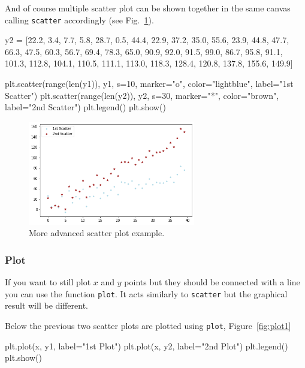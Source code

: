 And of course multiple scatter plot can be shown together in the same canvas calling \texttt{scatter} accordingly (see Fig.~\ref{fig:scatter2}).

\begin{ipythonnon}
y2 = [22.2, 3.4, 7.7, 5.8, 28.7, 0.5, 44.4, 22.9, 37.2, 35.0, 55.6,
      23.9, 44.8, 47.7, 66.3, 47.5, 60.3, 56.7, 69.4, 78.3, 65.0,
      90.9, 92.0, 91.5, 99.0, 86.7, 95.8, 91.1, 101.3, 112.8,
      104.1, 110.5, 111.1, 113.0, 118.3, 128.4, 120.8, 137.8, 155.6, 149.9]

plt.scatter(range(len(y1)), y1, s=10, marker="o",
color="lightblue", label="1st Scatter")
plt.scatter(range(len(y2)), y2, s=30, marker="*",
color="brown", label="2nd Scatter")
plt.legend()
plt.show()
\end{ipythonnon}

\begin{figure}[htb]
	\centering
	\includegraphics[width=0.65\textwidth]{figures/scatter2}
	\caption{More advanced scatter plot example.}
	\label{fig:scatter2}
\end{figure}

\subsubsection{Plot}\label{plot}

If you want to still plot $x$ and $y$ points but they should be connected with a line you can use the function \texttt{plot}. It acts similarly to \texttt{scatter} but the graphical result will be different.

Below the previous two scatter plots are plotted using \texttt{plot}, Figure~\ref{fig:plot1}

\begin{ipythonnon}
plt.plot(x, y1, label="1st Plot")
plt.plot(x, y2, label="2nd Plot")
plt.legend()
plt.show()
\end{ipythonnon}

